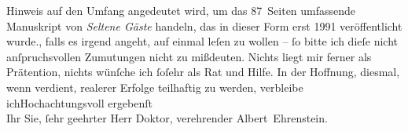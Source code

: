 \begin{ledgroupsized}[t]{13cm}
{{{                        Hinweis auf den Umfang angedeutet wird, um das 87 Seiten umfassende
                        Manuskript von \emph{Seltene Gäste} handeln, das
                        in dieser Form erst 1991 veröffentlicht wurde.}}}\label{K_L01792_2h}, falls es
                    irgend angeht, auf einmal leſen zu wollen – ſo bitte ich dieſe nicht
                    anſpruchsvollen Zumutungen nicht zu mißdeuten. Nichts liegt mir ferner als
                    Prätention, nichts wünſche ich ſoſehr als Rat und Hilfe. In der Hoffnung,
                    diesmal, wenn verdient, realerer Erfolge teilhaftig zu werden, verbleibe
                        ich\hspace*{1.5em}Hochachtungsvoll ergebenſt{\\}Ihr Sie,
                    ſehr geehrter Herr Doktor, verehrender\pend
           \pstart \spacefill\mbox{Albert Ehrenstein.}\pend{}\endnumbering{}\end{ledgroupsized}  \newcommand{\dateiname}{L01792}\newcommand{\titel}{Albert Ehrenstein an Arthur Schnitzler, 10. 10. 1908}\newcommand{\editorInnen}{Martin Anton Müller und Gerd-Hermann Susen}
      
